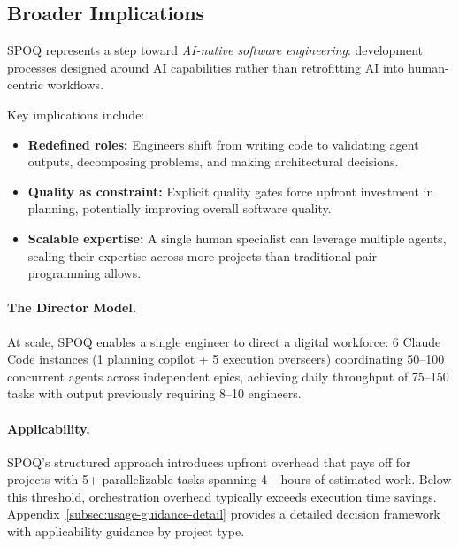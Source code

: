 \subsection{Broader Implications}
\label{subsec:implications}

SPOQ represents a step toward \textit{AI-native software engineering}:
development processes designed around AI capabilities rather than
retrofitting AI into human-centric workflows.

Key implications include:

\begin{itemize}
    \item \textbf{Redefined roles:} Engineers shift from writing code
    to validating agent outputs, decomposing problems, and making
    architectural decisions.

    \item \textbf{Quality as constraint:} Explicit quality gates force
    upfront investment in planning, potentially improving overall
    software quality.

    \item \textbf{Scalable expertise:} A single human specialist can
    leverage multiple agents, scaling their expertise across more
    projects than traditional pair programming allows.
\end{itemize}

\paragraph{The Director Model.}
At scale, SPOQ enables a single engineer to direct a digital workforce:
6 Claude Code instances (1 planning copilot + 5 execution overseers)
coordinating 50--100 concurrent agents across independent epics, achieving
daily throughput of 75--150 tasks with output previously requiring
8--10 engineers.

\paragraph{Applicability.}
SPOQ's structured approach introduces upfront overhead that pays off for
projects with 5+ parallelizable tasks spanning 4+ hours of estimated work.
Below this threshold, orchestration overhead typically exceeds execution
time savings. Appendix~\ref{subsec:usage-guidance-detail} provides a
detailed decision framework with applicability guidance by project type.
